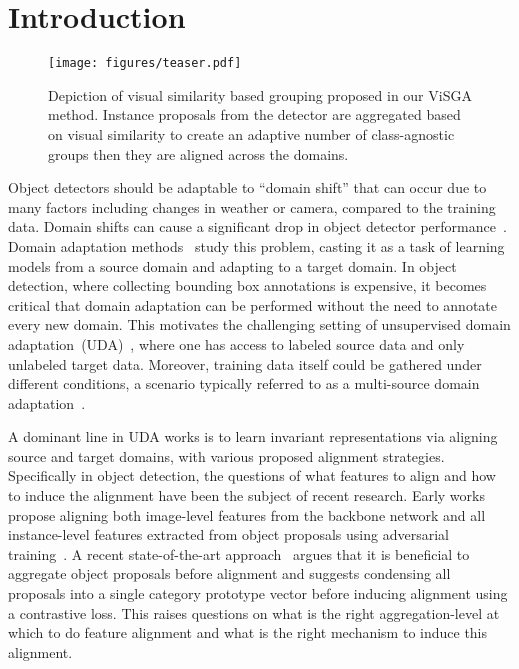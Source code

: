 \documentclass[10pt,twocolumn,letterpaper]{article}
\def\ourda{ViSGA\xspace}
\begin{document}
\section{Introduction}
\label{sec:introduction}
\begin{figure}[t]
	\centering
	\texttt{[image: figures/teaser.pdf]}
    \caption{Depiction of visual similarity based grouping proposed in our \ourda method. Instance proposals from the detector are aggregated based on visual similarity to create an adaptive number of class-agnostic groups then they are aligned across the domains.
    } 
	\label{fig:teaser}
	\vspace{-1mm}
\end{figure}
Object detectors should be adaptable to ``domain shift'' that can occur due to many factors including changes in weather or camera, compared to the training data. 
Domain shifts can cause a significant drop in object detector performance~\cite{da_faster_rcnn, gopalan2011domain}.  
Domain adaptation methods~\cite{duan2011visual, duan2012domain, tzeng2015simultaneous, long2015learning, long2017deep, motiian2017unified}  study this problem, casting it as a task of learning models from a source domain and adapting to a target domain. 
In object detection, where collecting bounding box annotations is expensive, it becomes critical that domain adaptation can be performed without the need to annotate every new domain.
This motivates the challenging setting of unsupervised domain adaptation~(UDA)~\cite{survey_2018, tzeng2017adversarial, lu2017unsupervised, cariucci2017autodial}, where one has access to labeled source data and only unlabeled target data. Moreover, training data itself could be gathered under different conditions, a scenario typically referred to as a multi-source domain adaptation~\cite{multipeng2019moment, multixu2018deep, multizhao2018adversarial, multizhao2019}.

A dominant line in UDA works is to learn invariant representations via aligning source and target domains, with various proposed alignment strategies.
Specifically in object detection, the questions of what features to align and how to induce the alignment have been the subject of recent research. 
Early works~\cite{da_faster_rcnn, he_iccv19_MAF} propose aligning both image-level features from the backbone network and all instance-level features extracted from object proposals using adversarial training~\cite{grl_ganin}. 
A recent state-of-the-art approach~\cite{GPA} argues that it is beneficial to aggregate object proposals before alignment and suggests condensing all proposals into a single category prototype vector before inducing alignment using a contrastive loss.
This raises questions on what is the right aggregation-level at which to do feature alignment and what is the right mechanism to induce this alignment.
\end{document}
